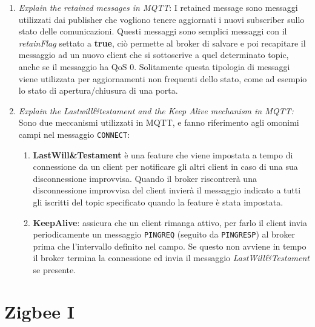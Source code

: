 \begin{enumerate}
\item \textit{Explain the retained messages in MQTT}: I retained message sono messaggi utilizzati dai publisher che vogliono tenere aggiornati i nuovi subscriber sullo stato delle comunicazioni. Questi messaggi sono semplici messaggi con il \emph{retainFlag} settato a \textbf{true}, ciò permette al broker di salvare e poi recapitare il messaggio ad un nuovo client che si sottoscrive a quel determinato topic, anche se il messaggio ha QoS 0. Solitamente questa tipologia di messaggi viene utilizzata per aggiornamenti non frequenti dello stato, come ad esempio lo stato di apertura/chiusura di una porta.


\item \textit{Explain the Lastwill\&testament and the Keep Alive mechanism in MQTT:} Sono due meccanismi utilizzati in MQTT, e fanno riferimento agli omonimi campi nel messaggio \texttt{CONNECT}:
\begin{enumerate}
   \item \textbf{LastWill\&Testament} è una feature che viene impostata a tempo di connessione da un client per notificare gli altri client in caso di una sua disconnessione improvvisa. Quando il broker riscontrerà una disconnessione improvvisa del client invierà il messaggio indicato a tutti gli iscritti del topic specificato quando la feature è stata impostata.

   \item \textbf{KeepAlive}: assicura che un client rimanga attivo, per farlo il client invia periodicamente un messaggio \texttt{PINGREQ} (seguito da \texttt{PINGRESP}) al broker prima che l'intervallo definito nel campo. Se questo non avviene in tempo il broker termina la connessione ed invia il messaggio \textit{LastWill\&Testament} se presente.
\end{enumerate}
\end{enumerate}

\newpage
\section{Zigbee I}

